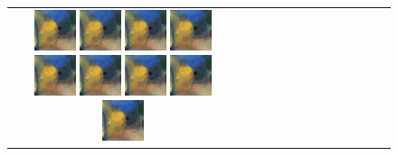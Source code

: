 \documentclass[3p,times,procedia]{elsarticle}
\begin{document}
\begin{figure}[H]
\begin{tabular}{c c c c c c c c c c c c c}
        \includegraphics[width=12mm]{figures/mul/cafe_terrace_at_nightpass40_best.png}
        
        \includegraphics[width=12mm]{figures/mul/cafe_terrace_at_nightpass41_best.png}
        
        \includegraphics[width=12mm]{figures/mul/cafe_terrace_at_nightpass42_best.png}
        
        \includegraphics[width=12mm]{figures/mul/cafe_terrace_at_nightpass43_best.png}
        
        \includegraphics[width=12mm]{figures/mul/cafe_terrace_at_nightpass44_best.png}
        
        \includegraphics[width=12mm]{figures/mul/cafe_terrace_at_nightpass45_best.png}
        
        \includegraphics[width=12mm]{figures/mul/cafe_terrace_at_nightpass46_best.png}
        
        \includegraphics[width=12mm]{figures/mul/cafe_terrace_at_nightpass47_best.png}
        
        \includegraphics[width=12mm]{figures/mul/cafe_terrace_at_nightpass48_best.png}
        

\end{tabular}
\end{figure}
\end{document}
